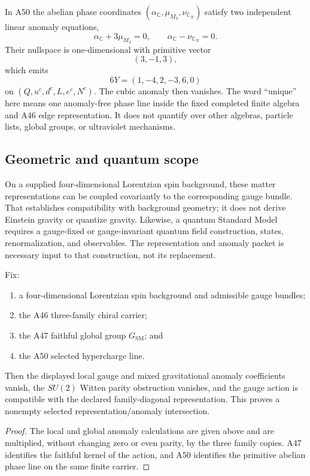 \documentclass[11pt]{article}
\newcommand{\GSM}{G_{\mathrm{SM}}}
\begin{document}
In A50 the abelian phase coordinates
$(\alpha_{\mathbb C},\mu_{M_3},\nu_{\mathbb C_N})$ satisfy two independent
linear anomaly equations,
\[
 \alpha_{\mathbb C}+3\mu_{M_3}=0,
 \qquad
 \alpha_{\mathbb C}-\nu_{\mathbb C_N}=0.
\]
Their nullspace is one-dimensional with primitive vector
\[
 (3,-1,3),
\]
which emits
\[
 6Y=(1,-4,2,-3,6,0)
\]
on $(Q,u^c,d^c,L,e^c,N^c)$.  The cubic anomaly then vanishes.  The word
``unique'' here means one anomaly-free phase line inside the fixed completed
finite algebra and A46 edge representation.  It does not quantify over other
algebras, particle lists, global groups, or ultraviolet mechanisms.

\subsection{Geometric and quantum scope}

On a supplied four-dimensional Lorentzian spin background, these matter
representations can be coupled covariantly to the corresponding gauge bundle.
That establishes compatibility with background geometry; it does not derive
Einstein gravity or quantize gravity.  Likewise, a quantum Standard Model
requires a gauge-fixed or gauge-invariant quantum field construction, states,
renormalization, and observables.  The representation and anomaly packet is
necessary input to that construction, not its replacement.

\begin{theorem}\label{thm:sm}
Fix:
\begin{enumerate}
\item a four-dimensional Lorentzian spin background and admissible gauge
bundles;
\item the A46 three-family chiral carrier;
\item the A47 faithful global group $\GSM$; and
\item the A50 selected hypercharge line.
\end{enumerate}
Then the displayed local gauge and mixed gravitational anomaly coefficients
vanish, the $SU(2)$ Witten parity obstruction vanishes, and the gauge action is
compatible with the declared family-diagonal representation.  This proves a
nonempty selected representation/anomaly intersection.
\end{theorem}

\begin{proof}
The local and global anomaly calculations are given above and are multiplied,
without changing zero or even parity, by the three family copies.  A47
identifies the faithful kernel of the action, and A50 identifies the primitive
abelian phase line on the same finite carrier.
\end{proof}
\end{document}

